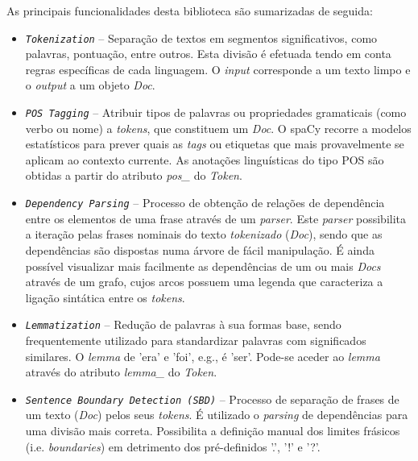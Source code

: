 \documentclass[12pt]{article}
\begin{document}
As principais funcionalidades desta biblioteca são sumarizadas de seguida:
\vspace*{-0.3cm}
\begin{itemize}\itemsep1pt
	\setlength{\itemindent}{+.5cm}	
	\item \texttt{\textit{Tokenization}} -- Separação de textos em segmentos significativos, como palavras, pontuação,  entre outros. Esta divisão é efetuada tendo em conta regras específicas de cada linguagem. O \textit{input} corresponde a um texto limpo e o \textit{output} a um objeto \textit{Doc}.
	
	\item \texttt{\textit{POS Tagging}} -- Atribuir tipos de palavras ou propriedades gramaticais (como verbo ou nome) a \textit{tokens}, que constituem um \textit{Doc}. O spaCy recorre a modelos estatísticos para prever quais as \textit{tags} ou etiquetas que mais provavelmente se aplicam ao contexto currente. As anotações linguísticas do tipo POS são obtidas a partir do atributo \textit{pos\_} do \textit{Token}.
	
	\item \texttt{\textit{Dependency Parsing}} -- Processo de obtenção de relações de dependência entre os elementos de uma frase através de um \textit{parser}. Este \textit{parser} possibilita a iteração pelas frases nominais do texto \textit{tokenizado} (\textit{Doc}), sendo que as dependências são dispostas numa árvore de fácil manipulação. É ainda possível visualizar mais facilmente as dependências de um ou mais \textit{Docs} através de um grafo, cujos arcos possuem uma legenda que caracteriza a ligação sintática entre os \textit{tokens}. 
	
	\item \texttt{\textit{Lemmatization}} -- Redução de palavras à sua formas base, sendo frequentemente utilizado para standardizar palavras com significados similares. O \textit{lemma} de 'era' e 'foi', e.g., é 'ser'. Pode-se aceder ao \textit{lemma} através do atributo \textit{lemma\_} do \textit{Token}.
	
	\item \texttt{\textit{Sentence Boundary Detection (SBD)}} -- Processo de separação de frases de um texto (\textit{Doc}) pelos seus \textit{tokens}. É utilizado o \textit{parsing} de dependências para uma divisão mais correta. Possibilita a definição manual dos limites frásicos (i.e. \textit{boundaries})	em detrimento dos pré-definidos '.', '!' e '?'.
	

\end{itemize}
\end{document}
